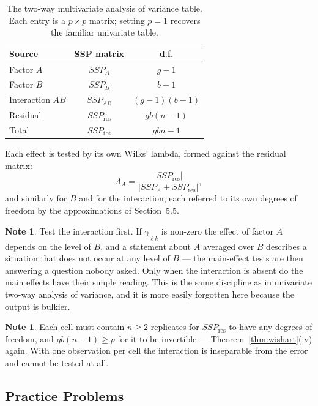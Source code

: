 \documentclass[11pt,a4paper]{article}
\theoremstyle{definition}
\newtheorem{note}[thm]{Note}
\begin{document}
\begin{table}[H]
\centering
\small
\begin{tabular}{|l|c|c|}
\hline
\textbf{Source} & \textbf{SSP matrix} & \textbf{d.f.}\\
\hline
Factor $A$ & $SSP_A$ & $g-1$\\
Factor $B$ & $SSP_B$ & $b-1$\\
Interaction $AB$ & $SSP_{AB}$ & $(g-1)(b-1)$\\
Residual & $SSP_{\text{res}}$ & $gb(n-1)$\\
\hline
Total & $SSP_{\text{tot}}$ & $gbn-1$\\
\hline
\end{tabular}
\caption{The two-way multivariate analysis of variance table. Each entry is a
$p\times p$ matrix; setting $p=1$ recovers the familiar univariate table.}
\label{tab:twowaymanova}
\end{table}

Each effect is tested by its own Wilks' lambda, formed against the residual
matrix:
$$\Lambda_A = \frac{\left|SSP_{\text{res}}\right|}
{\left|SSP_A + SSP_{\text{res}}\right|},$$
and similarly for $B$ and for the interaction, each referred to its own degrees
of freedom by the approximations of Section~5.5.

\begin{note}
Test the interaction first. If $\underline{\gamma}_{\ell k}$ is non-zero the
effect of factor $A$ depends on the level of $B$, and a statement about $A$
averaged over $B$ describes a situation that does not occur at any level of
$B$ --- the main-effect tests are then answering a question nobody asked. Only
when the interaction is absent do the main effects have their simple reading.
This is the same discipline as in univariate two-way analysis of variance, and
it is more easily forgotten here because the output is bulkier.
\end{note}

\begin{note}
Each cell must contain $n\geq2$ replicates for $SSP_{\text{res}}$ to have any
degrees of freedom, and $gb(n-1)\geq p$ for it to be invertible ---
Theorem~\ref{thm:wishart}(iv) again. With one observation per cell the interaction is
inseparable from the error and cannot be tested at all.
\end{note}



\subsection{Practice Problems}
\end{document}
